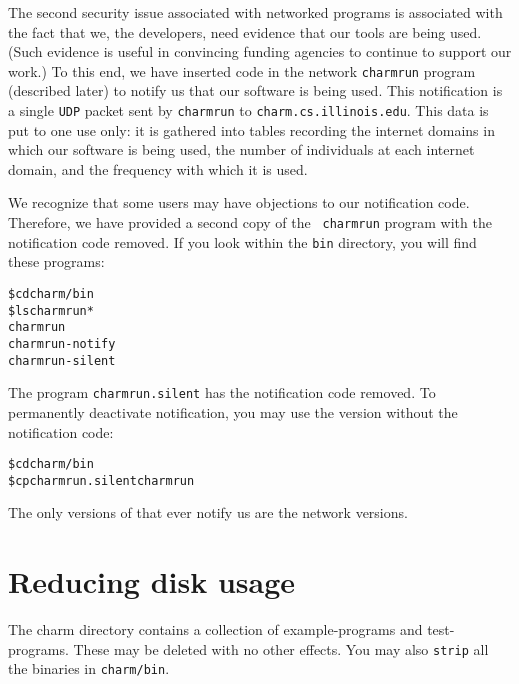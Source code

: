 The second security issue associated with networked programs is
associated with the fact that we, the \charmpp{} developers, need evidence
that our tools are being used.  (Such evidence is useful in convincing
funding agencies to continue to support our work.)  To this end, we
have inserted code in the network {\tt charmrun} program (described
later) to notify us that our software is being used.
This notification is a single {\tt UDP} packet sent by {\tt charmrun}
to {\tt charm.cs.illinois.edu}.  This data is put
to one use only: it is gathered into tables recording the internet
domains in which our software is being used, the number of individuals
at each internet domain, and the frequency with which it is used.

We recognize that some users may have objections to our notification
code.  Therefore, we have provided a second copy of the {\tt
charmrun} program with the notification code removed.  If you look
within the {\tt bin} directory, you will find these programs:

\begin{alltt}
    \$ cd charm/bin
    \$ ls charmrun*
    charmrun
    charmrun-notify
    charmrun-silent
\end{alltt}

The program {\tt charmrun.silent} has the notification code removed.  To
permanently deactivate notification, you may use the version without the
notification code:

\begin{alltt}
    \$ cd charm/bin
    \$ cp charmrun.silent charmrun
\end{alltt}

The only versions of \charmpp{} that ever notify us are 
the network versions.


\section{Reducing disk usage}

The charm directory contains a collection of example-programs and
test-programs.  These may be deleted with no other effects. You may 
also {\tt strip} all the binaries in {\tt charm/bin}.





